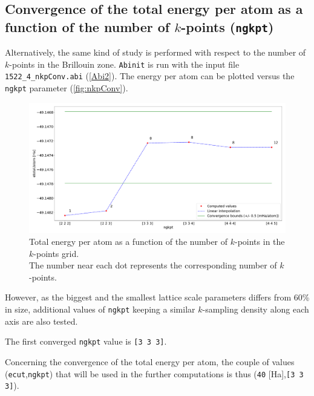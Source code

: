 \documentclass[11pt,a4paper]{article}
\begin{document}
\subsection{Convergence of the total energy per atom as a function of the number of $k$-points (\texttt{ngkpt})}
\label{convEtotNkpt}
Alternatively, the same kind of study is performed with respect to the number of $k$-points in the Brillouin zone. \texttt{Abinit} is run with the input file \texttt{1522\_4\_nkpConv.abi} (\autoref{Abi2}). The energy per atom can be plotted versus the \texttt{ngkpt} parameter (\autoref{fig:nkpConv}).
\begin{figure}[h]
\includegraphics[width=\textwidth]{images/etotngkpt.pdf}
\caption{Total energy per atom as a function of the number of $k$-points in the $k$-points grid.\\
The number near each dot represents the corresponding number of $k$-points.
}
\label{fig:nkpConv}
\end{figure}
However, as the biggest and the smallest lattice scale parameters differs from 60\% in size, additional values of \texttt{ngkpt} keeping a similar $k$-sampling density along each axis are also tested.

The first converged \texttt{ngkpt} value is \texttt{[3 3 3]}.

Concerning the convergence of the total energy per atom, the couple of values (\texttt{ecut},\texttt{ngkpt}) that will be used in the further computations is thus (\texttt{40} [Ha],\texttt{[3 3 3]}).
\end{document}
